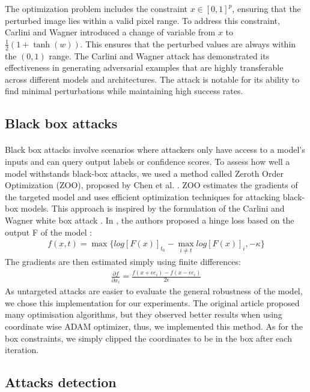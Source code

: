 \documentclass[11pt,twocolumn,letterpaper]{article}
\begin{document}
The optimization problem includes the constraint $ x \in [0,1]^p $, ensuring that the perturbed image lies within a valid pixel range. To address this constraint, Carlini and Wagner introduced a change of variable from $x$ to $\frac{1}{2} (1 + \tanh(w))$. 
This ensures that the perturbed values are always within the $(0,1)$ range.
The Carlini and Wagner attack has demonstrated its effectiveness in generating adversarial examples that are highly transferable across different models and architectures. The attack is notable for its ability to find minimal perturbations while maintaining high success rates.
\subsection{Black box attacks}

\paragraph{}

Black box attacks involve scenarios where attackers only have access to a model's inputs and can query output labels or confidence scores. To assess how well a model withstands black-box attacks, we used a method called Zeroth Order Optimization (ZOO), proposed by Chen et al. \cite{Chen_2017}. ZOO estimates the gradients of the targeted model and uses efficient optimization techniques for attacking black-box models.
This approach is inspired by the formulation of the Carlini and Wagner white box attack \cite{robustness}.
In \cite{Chen_2017}, the authors proposed a hinge loss based on the output F of the model :
\begin{align*}
    f(x,t) = \max \{log[F(x)]_{t_0} - \max_{i \neq t}log[F(x)]_i, -\kappa \}
\end{align*}
The gradients are then estimated simply using finite differences:
\begin{align*}
    \frac{\partial f}{\partial x_i} = \frac{f(x + \epsilon e_i) - f(x - \epsilon e_i)}{2 \epsilon}
\end{align*}
As untargeted attacks are easier to evaluate the general robustness of the model, we chose this implementation for our experiments. The original article proposed many optimisation algorithms, but they observed better results when using coordinate wise ADAM optimizer, thus, we implemented this method. As for the box constraints, we simply clipped the coordinates to be in the box after each iteration.

\subsection{Attacks detection}
\end{document}
